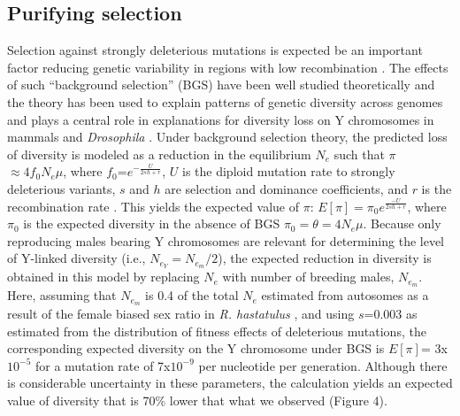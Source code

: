 \documentclass[9pt,twocolumn,twoside]{gsajnl}
\begin{document}
\subsection*{Purifying selection}
Selection against strongly deleterious mutations is expected be an important factor reducing genetic variability in regions with low recombination \citep{charlesworth1993effect, charlesworth1996background}. The effects of such “background selection” (BGS) have been well studied theoretically \citep{charlesworth1997effects, nordborg1996effect, kim2000joint} and the theory has been used to explain patterns of genetic diversity across genomes \citep{comeron2014background} and plays a central role in explanations for diversity loss on Y chromosomes in mammals \citep{Wilsonsayres2014} and \textit{Drosophila} \citep{mcallister1999, charlesworth1996CB}. Under background selection theory, the predicted loss of diversity is modeled as a reduction in the equilibrium $N_{e}$ such that $\pi$ $\approx 4f_{0}N_{e}\mu$, where $f_{0}$=$e^{-\frac{U}{2sh+r}}$, $U$ is the diploid mutation rate to strongly deleterious variants, $s$ and $h$ are selection and dominance coefficients, and $r$ is the recombination rate \citep{hudson1995deleterious}. This yields the expected value of $\pi$: $E[\pi]=\pi_{0}e^{\frac{-U}{2sh+r}}$, where $\pi_{0}$ is the expected diversity in the absence of BGS $\pi_{0}=\theta=4N_{e}\mu$. Because only reproducing males bearing Y chromosomes are relevant for determining the level of Y-linked diversity (i.e., $N_{e}_{Y} = N_{e}_{m}/2$), the expected reduction in diversity is obtained in this model by replacing $N_{e}$ with number of breeding males, $N_{e}_{m}$. Here, assuming that $N_{e}_{m}$ is 0.4 of the total $N_{e}$ estimated from autosomes as a result of the female biased sex ratio in \textit{R. hastatulus} \citep{pickup2013influence}, and using $s$=0.003 as estimated from the distribution of fitness effects of deleterious mutations, the corresponding expected diversity on the Y chromosome under BGS is $E[\pi]$= 3x$10^{-5}$ for a mutation rate of 7x$10^{-9}$ per nucleotide per generation. Although there is considerable uncertainty in these parameters, the calculation yields an expected value of diversity that is 70\% lower that what we observed (Figure 4).
\end{document}
